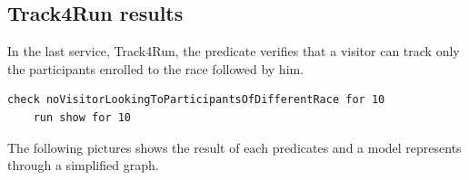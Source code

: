     \subsection{Track4Run results}
    In the last service, Track4Run, the predicate verifies that a visitor can track only the participants enrolled to the race followed by him.
   
\begin{lstlisting}[language=alloy]
    check noVisitorLookingToParticipantsOfDifferentRace for 10
    run show for 10
\end{lstlisting} 
    
    \begin{figure}[H]
        \centering
        \caption{ }
        \label{ fig:T4R-Results }
    \end{figure}
    
    \begin{figure}[H]
        \centering
        \caption{ }
        \label{ fig:T4R-model }
    \end{figure}
    
    The following pictures shows the result of each predicates and a model represents through a simplified graph.
